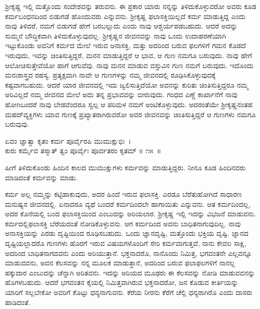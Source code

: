 ಶ‍್ರೀಕೃಷ್ಣ ಇಲ್ಲಿ ಮತ್ತೊಂದು ಸಂದೇಶವನ್ನು ತರುವನು. ಈ ಪ್ರಕಾರ ಯಾರು ನನ್ನನ್ನು ತಿಳಿದುಕೊಳ್ಳುವರೋ ಅವರು ಕೂಡ ಕರ್ಮಬಂಧನದಿಂದ ಬಿಡುಗಡೆ ಹೊಂದುವರು ಎನ್ನುವನು. ಶ‍್ರೀಕೃಷ್ಣ ಫಲಾಸಕ್ತಿಯಿಲ್ಲದೆ ಕರ್ಮ ಮಾಡುತ್ತಿದ್ದ ಎಂದು ನಾವು ತಿಳಿದರೆ, ನಮಗೆ ಬಿಡುಗಡೆ ಹೇಗೆ ಬರಬಲ್ಲುದು ಎಂದು ನಾವು ಆಶ್ಚರ್ಯಪಡಬಹುದು. ಆದರೆ ಅದನ್ನು ಸುಮ್ಮನೆ ಬೌದ್ಧಿಕವಾಗಿ ತಿಳಿದುಕೊಳ್ಳುವುದಲ್ಲ. ಶ‍್ರೀಕೃಷ್ಣನ ಜೀವನವನ್ನು ನಾವು ಒಂದು ಉದಾಹರಣೆಯಾಗಿ ಇಟ್ಟುಕೊಂಡು ಅವನಿಗೆ ಕರ್ಮದ ಮೇಲೆ ಇರುವ ಅನಾಸಕ್ತಿ, ಮತ್ತು ಅದರಿಂದ ಬರುವ ಫಲಗಳಿಗೆ ಗಮನ ಕೊಡದೆ ಇರುವುದು, ಇವನ್ನು ಚಿಂತಿಸುತ್ತಿದ್ದರೆ, ಮನನ ಮಾಡುತ್ತಿದ್ದರೆ ಆ ಭಾವ, ಆ ಗುಣ ನಮಗೂ ಬರುವುದು. ನಾವು ಹೇಗೆ ಆಲೋಚಿಸುತ್ತೇವೆಯೋ ಹಾಗೆ ಆಗುವೆವು. ನಾವು ಮನನ ಮಾಡುವ ವಸ್ತುವಿನ ಗುಣ ನಮಗೆ ಬರುವುದು. ಇದೊಂದು ಮನಃಶಾಸ್ತ್ರದ ರಹಸ್ಯ. ಪ್ರತ್ಯಕ್ಷವಾಗಿ ನಾವೇ ಆ ಗುಣಗಳನ್ನು ನಮ್ಮ ಜೀವನದಲ್ಲಿ ರೂಢಿಸಿಕೊಳ್ಳುವುದಕ್ಕೆ ಕಷ್ಟವಾಗಬಹುದು. ಆದರೆ ಯಾರ ಜೀವನದಲ್ಲಿ ಇದು ಜ್ವಲಿಸುತ್ತಿದೆಯೋ ಅವನನ್ನು ಕುರಿತು ಚಿಂತಿಸುತ್ತಿದ್ದರೂ ನಮ್ಮ ಅರಿವಿಲ್ಲದೆ ನಮ್ಮ ಜೀವನದ ಮೇಲೆ ಅದು ತನ್ನ ಪ್ರಭಾವವನ್ನು ಬೀರುವುದು. ಗಂಧದ ಎಣ್ಣೆ ಕಾರ್ಖಾನೆಗೆ ನಾವು ಹೋಗಿಬಂದರೆ ನಾವು ಬೇಡವೆಂದರೂ ಸ್ವಲ್ಪ ಆ ಪರಿಮಳ ನಮಗೆ ಅಂಟಿಕೊಳ್ಳುವುದು. ಅದರಂತೆಯೇ ಶ‍್ರೀಕೃಷ್ಣನಂತಹ ಮಹದ್​ವ್ಯಕ್ತಿಗಳು ಯಾವ ಗುಣಕ್ಕೆ ಪ್ರಖ್ಯಾತರಾಗಿರುವರೋ ಅವರ ಜೀವನವನ್ನು ಚಿಂತಿಸುತ್ತಿದ್ದರೆ ಆ ಗುಣಗಳು ನಮಗೂ ಬರುವುವು.

\begin{shloka}
ಏವಂ ಜ್ಞಾತ್ವಾ ಕೃತಂ ಕರ್ಮ ಪೂರ್ವೈರಪಿ ಮುಮುಕ್ಷುಭಿಃ~।\\ಕುರು ಕರ್ಮೈವ ತಸ್ಮಾತ್ ತ್ವಂ ಪೂರ್ವೈಃ ಪೂರ್ವತರಂ ಕೃತಮ್ \hfill॥ ೧೫~॥
\end{shloka}

\begin{artha}
ಹೀಗೆ ತಿಳಿದುಕೊಂಡು ಹಿಂದಿನ ಕಾಲದ ಮುಮುಕ್ಷುಗಳು ಕರ್ಮವನ್ನು ಮಾಡುತ್ತಿದ್ದರು. ನೀನೂ ಕೂಡ ಹಿಂದಿನವರು ಮಾಡಿದಂತೆ ಕರ್ಮವನ್ನು ಮಾಡು.
\end{artha}

ಕರ್ಮ ಅಲ್ಲ ನಮ್ಮನ್ನು ಕಟ್ಟಿಹಾಕುವುದು, ಅದರ ಹಿಂದೆ ಇರುವ ಫಲಾಸಕ್ತಿ. ಎರಡೂ ಬೆರೆತುಹೋಗಿದೆ ಸಾಧಾರಣ ಮನುಷ್ಯನ ಜೀವನದಲ್ಲಿ. ಏನಾದರೂ ವ್ಯಥೆ ಬಂದರೆ ಕರ್ಮದಿಂದಲೇ ಹಾಗಾಯಿತು ಎನ್ನುವನು. ಆತ ಕರ್ಮ\-ದಿಂದಲ್ಲ, ಅದರ ಕೊನೆಯಲ್ಲಿ ಬಂದ ಫಲಾಸಕ್ತಿಯಿಂದ ಎಂಬುದನ್ನು ಅರಿಯಲಾರ. ಶ‍್ರೀಕೃಷ್ಣ ಇಲ್ಲಿ ಇದನ್ನು ವಿಭಜನೆ ಮಾಡುವನು. ಕರ್ಮದಲ್ಲಿ\break ಫಲಾಸಕ್ತಿ ಬೆರೆಯದಂತೆ ನೋಡಿಕೊಳ್ಳುವನು. ಆಗ ಕರ್ಮದಿಂದ ಅವನು ಬಾಧಿತನಾಗುವುದಿಲ್ಲ. ನಾವು ಅನಾಸಕ್ತಿಯನ್ನು ಎರಡು ದೃಷ್ಟಿಯಿಂದ ರೂಢಿಸಬಹುದು. ಒಂದು ಜ್ಞಾನದೃಷ್ಟಿ, ಮತ್ತೊಂದು ಭಕ್ತಿಯ ದೃಷ್ಟಿ. ಜ್ಞಾನದ ದೃಷ್ಟಿಯಲ್ಲಾದರೊ ಗುಣಗಳು ಹೊರಗೆ ಇರುವ ವಿಷಯಗಳೊಂದಿಗೆ ಸೇರಿ ಕರ್ಮವಾಗುತ್ತವೆ, ನಾನು ಕೇವಲ ಸಾಕ್ಷಿ, ಅದರಿಂದ ಬಾಧಿತನಾಗದವನು ಎಂದು ಅರಿಯುತ್ತಾನೆ. ಭಕ್ತನಾದರೊ, ನಾನೊಂದು ನಿಮಿತ್ತ, ಭಗವಂತನೇ ಎಲ್ಲವನ್ನೂ ಮಾಡುವವನು, ಅವನ ಕೆಲಸವನ್ನು ನನ್ನ ಮೂಲಕ ಮಾಡುತ್ತಾನೆ, ಅದರಿಂದ ಬರುವ ಫಲಾಫಲಗಳಿಗೆ ನಾನಲ್ಲ ಹಕ್ಕುದಾರ ಎಂಬುದನ್ನು ಚೆನ್ನಾಗಿ ಅರಿತವನು. ಇದನ್ನು ಅರಿಯದ ಮೂಢರು ಈ ಕೆಲಸವನ್ನು ನೋಡಿ ಮಾಡುವವನನ್ನು ಹೊಗಳಬಹುದು. ಆದರೆ ಭಗವಂತನ ಕೈಯಲ್ಲಿ ನಿಮಿತ್ತವಾಗಿರುವ ಭಕ್ತ\-ನಾದರೋ, ಜನ ಕೊಡುವ ಕೀರ್ತಿಯನ್ನು ಯಾರಿಗೆ ಸಲ್ಲಬೇಕೋ ಅವರಿಗೆ ಕೊಟ್ಟು ಧನ್ಯನಾಗುವನು. ಕೆರೆಯ ನೀರನು ಕೆರೆಗೆ ಚೆಲ್ಲಿ ಧನ್ಯರಾಗಿರೊ ಎಂದು ದಾಸರು ಹಾಡಿದಂತೆ.


